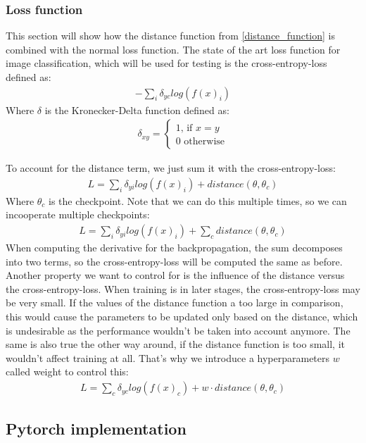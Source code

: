 \subsubsection{Loss function}
This section will show how the distance function from \ref{distance_function} is
combined with the normal loss function. The state of the art loss function for
image classification, which will be used for testing is the cross-entropy-loss
defined as:
\begin{align}
    -\sum_{i} \delta_{yc} log(f(x)_i)
\end{align}
Where $\delta$ is the Kronecker-Delta function defined as:
\begin{align}
    \delta_{xy} =
    \begin{cases}
        1 \textrm{, if } x=y \\
        0 \textrm{ otherwise}
    \end{cases}
\end{align}

To account for the distance term, we just sum it with the cross-entropy-loss:
\begin{align}
    L=\sum_{i} \delta_{yi} log(f(x)_i) + distance(\theta, \theta_c)
\end{align}
Where $\theta_c$ is the checkpoint.
Note that we can do this multiple times, so we can incooperate multiple
checkpoints:
\begin{align}
    L=\sum_{i} \delta_{yi} log(f(x)_i) + \sum_c distance(\theta, \theta_c)
\end{align}
 When computing the derivative for the backpropagation, the sum
decomposes into two terms, so the cross-entropy-loss will be computed the same
as before. Another property we want to control for is the influence of the
distance versus the cross-entropy-loss. When training is in later stages, the
cross-entropy-loss may be very small. If the values of the distance function a
too large in comparison, this would cause the parameters to be updated only
based on the distance, which is undesirable as the performance wouldn't be taken
into account anymore. The same is also true the other way around, if the
distance function is too small, it wouldn't affect training at all. That's why
we introduce a hyperparameters $w$ called weight to control this:
\begin{align}\label{eq:LossDistance}
    L=\sum_{c} \delta_{yc} log(f(x)_c) + w \cdot distance(\theta, \theta_c)
\end{align}

\subsection{Pytorch implementation}

